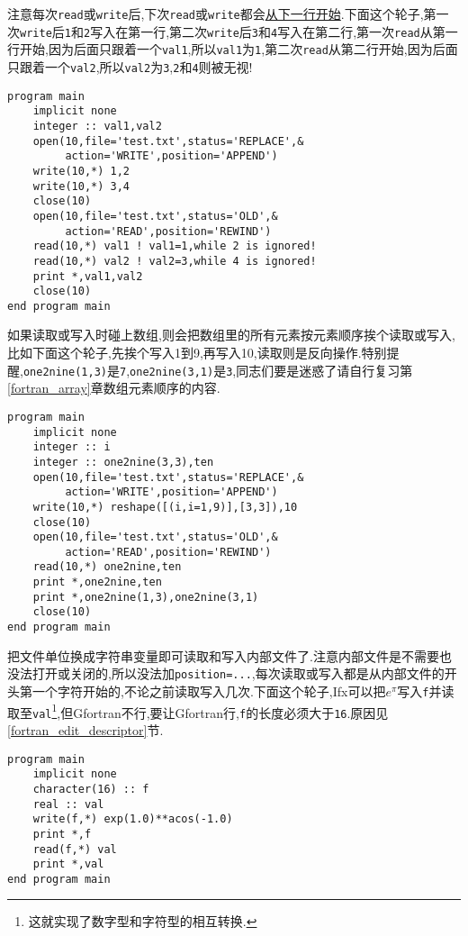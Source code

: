 注意每次\texttt{read}或\texttt{write}后,下次\texttt{read}或\texttt{write}都会\uline{从下一行开始}.下面这个轮子,第一次\texttt{write}后\texttt{1}和\texttt{2}写入在第一行,第二次\texttt{write}后\texttt{3}和\texttt{4}写入在第二行,第一次\texttt{read}从第一行开始,因为后面只跟着一个\texttt{val1},所以\texttt{val1}为\texttt{1},第二次\texttt{read}从第二行开始,因为后面只跟着一个\texttt{val2},所以\texttt{val2}为\texttt{3},\texttt{2}和\texttt{4}则被无视!
\begin{lstlisting}
program main
    implicit none
    integer :: val1,val2
    open(10,file='test.txt',status='REPLACE',&
         action='WRITE',position='APPEND')
    write(10,*) 1,2
    write(10,*) 3,4
    close(10)
    open(10,file='test.txt',status='OLD',&
         action='READ',position='REWIND')
    read(10,*) val1 ! val1=1,while 2 is ignored!
    read(10,*) val2 ! val2=3,while 4 is ignored!
    print *,val1,val2
    close(10)
end program main
\end{lstlisting}

如果读取或写入时碰上数组,则会把数组里的所有元素按元素顺序挨个读取或写入,比如下面这个轮子,先挨个写入1到9,再写入10,读取则是反向操作.特别提醒,\texttt{one2nine(1,3)}是\texttt{7},\texttt{one2nine(3,1)}是\texttt{3},同志们要是迷惑了请自行复习第\ref{fortran_array}章数组元素顺序的内容.
\begin{lstlisting}
program main
    implicit none
    integer :: i
    integer :: one2nine(3,3),ten
    open(10,file='test.txt',status='REPLACE',&
         action='WRITE',position='APPEND')
    write(10,*) reshape([(i,i=1,9)],[3,3]),10
    close(10)
    open(10,file='test.txt',status='OLD',&
         action='READ',position='REWIND')
    read(10,*) one2nine,ten
    print *,one2nine,ten
    print *,one2nine(1,3),one2nine(3,1)
    close(10)
end program main
\end{lstlisting}

把文件单位换成字符串变量即可读取和写入内部文件了.注意内部文件是不需要也没法打开或关闭的,所以没法加\texttt{position=...},每次读取或写入都是从内部文件的开头第一个字符开始的,不论之前读取写入几次.下面这个轮子,Ifx可以把$e^\pi$写入\texttt{f}并读取至\texttt{val}\footnote{这就实现了数字型和字符型的相互转换.},但Gfortran不行,要让Gfortran行,\texttt{f}的长度必须大于\texttt{16}.原因见\ref{fortran_edit_descriptor}节.\label{internal_file}
\begin{lstlisting}
program main
    implicit none
    character(16) :: f
    real :: val
    write(f,*) exp(1.0)**acos(-1.0)
    print *,f
    read(f,*) val
    print *,val
end program main
\end{lstlisting}

